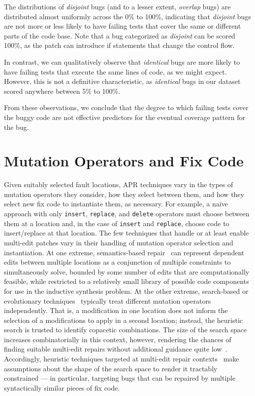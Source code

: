 \documentclass[10pt, conference]{IEEEtran}
\begin{document}
The distributions of \emph{disjoint} bugs (and to a lesser extent, \emph{overlap} bugs) are 
distributed almost uniformly across the 0\% to 100\%, indicating that \emph{disjoint} bugs are 
not more or less likely to have failing tests that cover the same or different parts of the code 
base. Note that a bug categorized as \emph{disjoint} can be scored 100\%, as the 
patch can introduce if statements that change the control flow.

In contrast, we can qualitatively observe that \emph{identical} bugs are more likely to have 
failing tests that execute the same lines of code, as we might expect. However, this is not a 
definitive characteristic, as \emph{identical} bugs in our dataset scored anywhere between 
5\% to 100\%.

From these observations, we conclude that the degree to which failing tests cover the buggy 
code are not effective predictors for the eventual coverage pattern for the bug. 


\section{Mutation Operators and Fix Code}
\label{sec:mutops}

Given suitably selected fault locations, APR techniques vary in the types of
mutation operators they consider, how they select between them, and how they
select new fix code to instantiate them, as necessary.  For example, a na{\"i}ve
approach with only \texttt{insert}, \texttt{replace}, and \texttt{delete}
operators must choose between them at a location and, in the case of
\texttt{insert} and \texttt{replace}, choose code to insert/replace at that
location.  
%
The few techniques that handle or at least enable multi-edit patches vary in their
handling of mutation operator selection and instantiation.  At one
extreme, semantics-based repair~\cite{s3,angelix} can represent dependent edits between multiple
locations as a conjunction of multiple constraints to simultaneously solve,
bounded by some number of edits that are computationally feasible, while
restricted to a relatively small library of possible code components for use in
the inductive synthesis problem.    At the other extreme, search-based or
evolutionary techniques~\cite{genprog,par} typically treat different mutation
operators independently.  That is, a modification in one location does not
inform the selection of a modifications to apply in a second location; instead,
the heuristic search is trusted to identify copacetic combinations.  The size of
the search space increases combinatorially in this context, however, rendering
the chances of finding suitable multi-edit repairs without additional guidance
quite low~\cite{ae,long-search-spaces}. Accordingly, heuristic techniques targeted at multi-edit
repair contexts~\cite{saha2019harnessing} make assumptions about the
shape of the search space to render it tractably constrained --- in particular,
targeting bugs that can be repaired by multiple syntactically similar pieces of
fix code.
\end{document}
